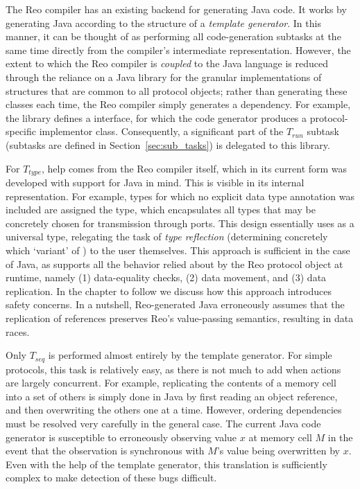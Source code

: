 \label{sec:decoupling_reo_rust}
The Reo compiler has an existing backend for generating Java code. It works by generating Java according to the structure of a \textit{template generator}. In this manner, it can be thought of as performing all code-generation subtasks at the same time directly from the compiler's intermediate representation. However, the extent to which the Reo compiler is \textit{coupled} to the Java language is reduced through the reliance on a Java library for the granular implementations of structures that are common to all protocol objects; rather than generating these classes each time, the Reo compiler simply generates a dependency. For example, the library defines a  interface, for which the code generator produces a protocol-specific implementor class. Consequently, a significant part of the $T_{run}$ subtask (subtasks are defined in Section~\ref{sec:sub_tasks}) is delegated to this library.

For $T_{type}$, help comes from the Reo compiler itself, which in its current form was developed with support for Java in mind. This is visible in its internal representation. For example, types for which no explicit data type annotation was included are assigned the  type, which encapsulates all types that may be concretely chosen for transmission through ports. This design essentially uses  as a universal type, relegating the task of \textit{type reflection} (determining concretely which `variant' of ) to the user themselves. This approach is sufficient in the case of Java, as  supports all the behavior relied about by the Reo protocol object at runtime, namely (1) data-equality checks, (2) data movement, and (3) data replication. In the chapter to follow we discuss how this approach introduces safety concerns. In a nutshell, Reo-generated Java erroneously assumes that the replication of  references preserves Reo's value-passing semantics, resulting in data races.

Only $T_{seq}$ is performed almost entirely by the template generator. For simple protocols, this task is relatively easy, as there is not much to add when actions are largely concurrent. For example, replicating the contents of a memory cell into a set of others is simply done in Java by first reading an object reference, and then overwriting the others one at a time. However, ordering dependencies must be resolved very carefully in the general case. The current Java code generator is susceptible to erroneously observing value $x$ at memory cell $M$ in the event that the observation is synchronous with $M$'s value being overwritten by $x$. Even with the help of the template generator, this translation is sufficiently complex to make detection of these bugs difficult.

